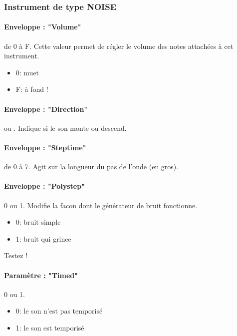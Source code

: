 \documentclass[12pt,a4paper]{article}
\begin{document}
        \subsubsection{Instrument de type NOISE}


        \paragraph{Enveloppe : "Volume"} de 0 à F. Cette valeur permet de régler le volume des notes attachées à cet instrument.
            \begin{itemize}
                \item{0: muet}
                \item{F: à fond !}
            \end{itemize}

        \paragraph{Enveloppe : "Direction"}  ou .
            Indique si le son monte ou descend.

        \paragraph{Enveloppe : "Steptime"} de 0 à 7. Agit sur la longueur du pas de l'onde (en gros).

        \paragraph{Enveloppe : "Polystep"} 0 ou 1. Modifie la facon dont le générateur de bruit fonctionne.
        \begin{itemize}
            \item{0: bruit simple}
            \item{1: bruit qui grince}
        \end{itemize}
        Testez !

        \paragraph{Paramètre : "Timed"} 0 ou 1.
        \begin{itemize}
                \item{0: le son n'est pas temporisé}
                \item{1: le son est temporisé}
            \end{itemize}
\end{document}

